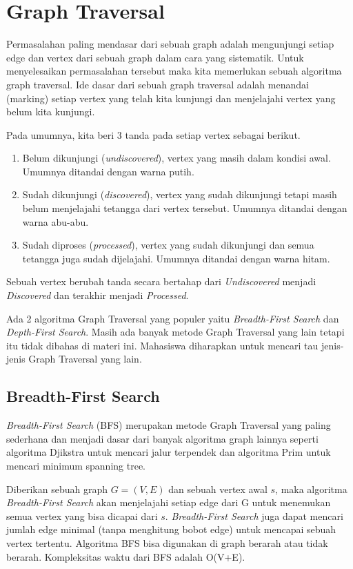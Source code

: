 \chapter{Graph Traversal}

Permasalahan paling mendasar dari sebuah graph adalah mengunjungi setiap edge dan vertex dari sebuah graph dalam cara yang sistematik. Untuk menyelesaikan permasalahan tersebut maka kita memerlukan sebuah algoritma graph traversal. Ide dasar dari sebuah graph traversal adalah menandai (marking) setiap vertex yang telah kita kunjungi dan menjelajahi vertex yang belum kita kunjungi.

Pada umumnya, kita beri 3 tanda pada setiap vertex sebagai berikut.
\begin{enumerate}
	\item Belum dikunjungi (\textit{undiscovered}), vertex yang masih dalam kondisi awal. Umumnya ditandai dengan warna putih.
	\item Sudah dikunjungi (\textit{discovered}), vertex yang sudah dikunjungi tetapi masih belum menjelajahi tetangga dari vertex tersebut. Umumnya ditandai dengan warna abu-abu.
	\item Sudah diproses (\textit{processed}), vertex yang sudah dikunjungi dan semua tetangga juga sudah dijelajahi. Umumnya ditandai dengan warna hitam.
\end{enumerate}

Sebuah vertex berubah tanda secara bertahap dari \textit{Undiscovered} menjadi \textit{Discovered} dan terakhir menjadi \textit{Processed}. 

Ada 2 algoritma Graph Traversal yang populer yaitu \textit{Breadth-First Search} dan \textit{Depth-First Search}. Masih ada banyak metode Graph Traversal yang lain tetapi itu tidak dibahas di materi ini. Mahasiswa diharapkan untuk mencari tau jenis-jenis Graph Traversal yang lain.

\section{Breadth-First Search}

\textit{Breadth-First Search} (BFS) merupakan metode Graph Traversal yang paling sederhana dan menjadi dasar dari banyak algoritma graph lainnya seperti algoritma Djikstra untuk mencari jalur terpendek dan algoritma Prim untuk mencari minimum spanning tree.

Diberikan sebuah graph $G = (V,E)$ dan sebuah vertex awal $s$, maka algoritma \textit{Breadth-First Search} akan menjelajahi setiap edge dari G untuk menemukan semua vertex yang bisa dicapai dari $s$. \textit{Breadth-First Search} juga dapat mencari jumlah edge minimal (tanpa menghitung bobot edge) untuk mencapai sebuah vertex tertentu. Algoritma BFS bisa digunakan di graph berarah atau tidak berarah. Kompleksitas waktu dari BFS adalah O(V+E).

